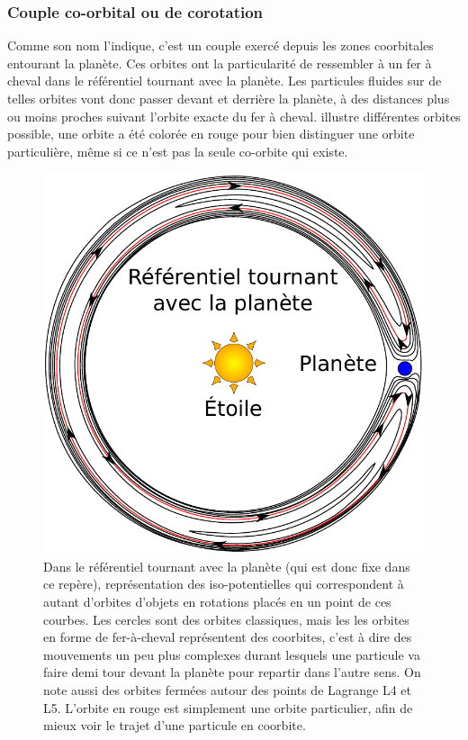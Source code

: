 \subsubsection{Couple co-orbital ou de corotation}
Comme son nom l'indique, c'est un couple exercé depuis les zones coorbitales entourant la planète. Ces orbites ont la particularité de ressembler à un fer à cheval dans le référentiel tournant avec la planète. Les particules fluides sur de telles orbites vont donc passer devant et derrière la planète, à des distances plus ou moins proches suivant l'orbite exacte du fer à cheval.  illustre différentes orbites possible, une orbite a été colorée en rouge pour bien distinguer une orbite particulière, même si ce n'est pas la seule co-orbite qui existe.

\begin{figure}[htb]
\centering
\includegraphics[width=0.75\linewidth]{figure/corotation_orbits.pdf}
\caption{Dans le référentiel tournant avec la planète (qui est donc fixe dans ce repère), représentation des iso-potentielles qui correspondent à autant d'orbites d'objets en rotations placés en un point de ces courbes. Les cercles sont des orbites classiques, mais les les orbites en forme de fer-à-cheval représentent des coorbites, c'est à dire des mouvements un peu plus complexes durant lesquels une particule va faire demi tour devant la planète pour repartir dans l'autre sens. On note aussi des orbites fermées autour des points de Lagrange L4 et L5. L'orbite en rouge est simplement une orbite particulier, afin de mieux voir le trajet d'une particule en coorbite.}\label{fig:corotation_orbits}
\end{figure}

